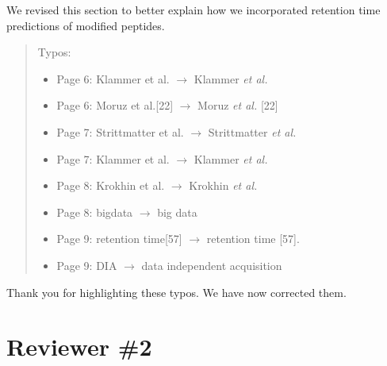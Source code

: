 \documentclass[letterpaper]{article}
\newcommand{\breview}{\begin{quotation}\begin{bf}\noindent}
\newcommand{\ereview}{\end{bf}\end{quotation}}
\begin{document}
We revised this section to better explain how we incorporated
retention time predictions of modified peptides. 

\breview
Typos:
\begin{itemize}
\item Page 6: Klammer et al. $\to$ Klammer {\em et al.}
\item Page 6: Moruz et al.[22] $\to$ Moruz {\em et al.} [22]
\item Page 7: Strittmatter et al. $\to$ Strittmatter {\em et al.}
\item Page 7: Klammer et al. $\to$ Klammer {\em et al.}
\item Page 8: Krokhin et al. $\to$ Krokhin {\em et al.}
\item Page 8: bigdata $\to$ big data
\item Page 9: retention time[57] $\to$ retention time [57].
\item Page 9: DIA $\to$ data independent acquisition
\end{itemize}

\ereview

Thank you for highlighting these typos. We have now corrected them.


\section*{Reviewer \#2}

\breview
\ereview
\end{document}
